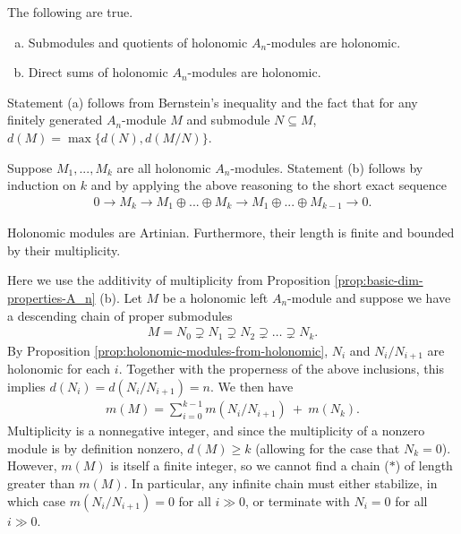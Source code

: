 \begin{prop}\label{prop:holonomic-modules-from-holonomic}
	The following are true.
	\begin{enumerate}[(a)]
		\item Submodules and quotients of holonomic $A_n$-modules are holonomic.
		\item Direct sums of holonomic $A_n$-modules are holonomic.
	\end{enumerate}
\end{prop}
\begin{prf}
	Statement (a) follows from Bernstein's inequality and the fact that for any finitely generated $A_n$-module $M$ and submodule $N \subseteq M$, $d(M) = \max\{d(N),d(M/N)\}$.

	Suppose $M_1,...,M_k$ are all holonomic $A_n$-modules. Statement (b) follows by induction on $k$ and by applying the above reasoning to the short exact sequence
	\begin{align*}
		0 \to M_k \to M_1\oplus...\oplus M_k \to M_1\oplus ...\oplus M_{k-1} \to 0.
	\end{align*}
\end{prf}
\begin{prop}\label{prop:holonomic-mods-are-artinian}
	Holonomic modules are Artinian. Furthermore, their length is finite and bounded by their multiplicity.
\end{prop}
\begin{prf}
	Here we use the additivity of multiplicity from Proposition \ref{prop:basic-dim-properties-A_n} (b). Let $M$ be a holonomic left $A_n$-module and suppose we have a descending chain of proper submodules
	\begin{align}\tag{$\ast$}
		M = N_0 \supsetneq N_1 \supsetneq N_2 \supsetneq \dots \supsetneq N_k.
	\end{align}
	By Proposition \ref{prop:holonomic-modules-from-holonomic}, $N_i$ and $N_i/N_{i+1}$ are holonomic for each $i$. Together with the properness of the above inclusions, this implies $d(N_i) = d(N_i/N_{i+1}) = n$. We then have
	\begin{align*}
		m(M) = \sum_{i=0}^{k-1} m(N_{i}/N_{i+1}) ~ + ~ m(N_{k}).
	\end{align*}
	Multiplicity is a nonnegative integer, and since the multiplicity of a nonzero module is by definition nonzero, $d(M) \geq k$ (allowing for the case that $N_k = 0$). However, $m(M)$ is itself a finite integer, so we cannot find a chain ($\ast$) of length greater than $m(M)$. In particular, any infinite chain must either stabilize, in which case $m(N_i/N_{i+1}) = 0$ for all $i \gg 0$, or terminate with $N_i = 0$ for all $i\gg 0$.
\end{prf}

